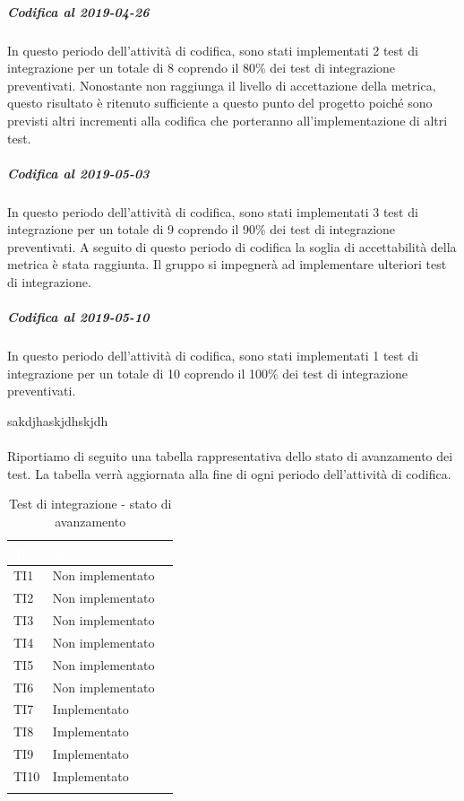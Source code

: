 \subparagraph{Codifica al 2019-04-26}
In questo periodo dell'attività di codifica, sono stati implementati 2 test di integrazione per un totale di 8 coprendo il 80\% dei test di integrazione preventivati.
Nonostante non raggiunga il livello di accettazione della
metrica, questo risultato è ritenuto sufficiente a questo punto del progetto poiché sono previsti altri incrementi alla codifica che porteranno all'implementazione di altri test. 

\subparagraph{Codifica al 2019-05-03}
In questo periodo dell'attività di codifica, sono stati implementati 3 test di integrazione per un totale di 9 coprendo il 90\% dei test di integrazione preventivati.
A seguito di questo periodo di codifica la soglia di accettabilità della metrica è stata raggiunta.
Il gruppo si impegnerà ad implementare ulteriori test di integrazione.


\subparagraph{Codifica al 2019-05-10}
In questo periodo dell'attività di codifica, sono stati implementati 1 test di integrazione per un totale di 10 coprendo il 100\% dei test di integrazione preventivati.

sakdjhaskjdhskjdh
\\
\\
Riportiamo di seguito una tabella rappresentativa dello stato di avanzamento dei test. La tabella verrà aggiornata alla fine di ogni periodo dell'attività di codifica.

	\begin{longtable}{|>{\centering\arraybackslash}m{1.6cm}|>{\centering\arraybackslash}m{6.41cm}|>{\centering\arraybackslash}m{3.1cm}|}		
	\rowcolor{LightBlue}
	\textbf{\textcolor{white}{Test}}
	& \textbf{\textcolor{white}{Stato}}\\
	\hline
	TI1
	& Non implementato
	\\ \hline
	\rowcolor{LightGray}
	TI2
	& Non implementato
	\\ \hline
	TI3
	& Non implementato
	\\ \hline
	\rowcolor{LightGray}
	TI4
	& Non implementato
	\\ \hline
	TI5
	& Non implementato
	\\ \hline
	\rowcolor{LightGray}
	TI6
	& Non implementato
	\\ \hline	
	TI7
	& Implementato
	\\ \hline	
	\rowcolor{LightGray}
	TI8
	& Implementato
	\\ \hline	
	TI9
	& Implementato
	\\ \hline	
	\rowcolor{LightGray}
	TI10
	& Implementato
	\\ \hline	
	\caption{Test di integrazione - stato di avanzamento}
\end{longtable}

